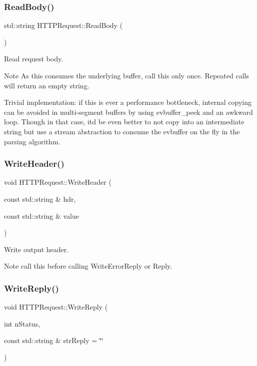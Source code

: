 \subsubsection{\texorpdfstring{Read\+Body()}{ReadBody()}}
{\footnotesize\ttfamily std\+::string H\+T\+T\+P\+Request\+::\+Read\+Body (\begin{DoxyParamCaption}{ }\end{DoxyParamCaption})}

Read request body.

\begin{DoxyNote}{Note}
As this consumes the underlying buffer, call this only once. Repeated calls will return an empty string. 
\end{DoxyNote}
Trivial implementation\+: if this is ever a performance bottleneck, internal copying can be avoided in multi-\/segment buffers by using evbuffer\+\_\+peek and an awkward loop. Though in that case, it\textquotesingle{}d be even better to not copy into an intermediate string but use a stream abstraction to consume the evbuffer on the fly in the parsing algorithm.\mbox{\label{class_h_t_t_p_request_a910ea3b361715e036dc74eb75e92fb62}} 
\subsubsection{\texorpdfstring{Write\+Header()}{WriteHeader()}}
{\footnotesize\ttfamily void H\+T\+T\+P\+Request\+::\+Write\+Header (\begin{DoxyParamCaption}\item[{const std\+::string \&}]{hdr,  }\item[{const std\+::string \&}]{value }\end{DoxyParamCaption})}

Write output header.

\begin{DoxyNote}{Note}
call this before calling Write\+Error\+Reply or Reply. 
\end{DoxyNote}
\mbox{\label{class_h_t_t_p_request_a43767ec5daf58e5a13a740ed56ddca3f}} 
\subsubsection{\texorpdfstring{Write\+Reply()}{WriteReply()}}
{\footnotesize\ttfamily void H\+T\+T\+P\+Request\+::\+Write\+Reply (\begin{DoxyParamCaption}\item[{int}]{n\+Status,  }\item[{const std\+::string \&}]{str\+Reply = {\ttfamily \char`\"{}\char`\"{}} }\end{DoxyParamCaption})}

